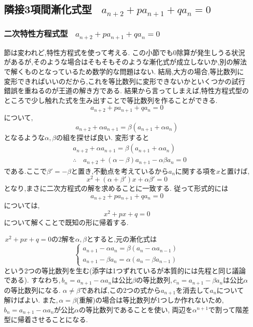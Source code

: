 
\subsection{隣接3項間漸化式型 \, $\displaystyle a_{n+2}+pa_{n+1}+qa_n=0$}
  \subsubsection{二次特性方程式型 \, $\displaystyle a_{n+2}+pa_{n+1}+qa_n=0$}
    節は変われど,特性方程式を使って考える.
    この小節でも0除算が発生しうる状況があるが,そのような場合はそもそもそのような漸化式が成立しないか,別の解法で解くものとなっているため数学的な問題はない.
    結局,大方の場合,等比数列に変形できればいいのだから,これを等比数列に変形できないかといくつかの試行錯誤を重ねるのが王道の解き方である.
    結果から言ってしまえば,特性方程式型のところで少し触れた式を生み出すことで等比数列を作ることができる.
    \[
      a_{n+2}+pa_{n+1}+qa_n=0
    \]
    について,
    \[
      a_{n+2}+\alpha a_{n+1}=\beta(a_{n+1}+\alpha a_{n})
    \]
    となるような$\alpha,\beta$の組を探せば良い.
    変形すると
    \begin{align*}
      &a_{n+2}+\alpha a_{n+1}=\beta(a_{n+1}+\alpha a_{n})\\
      &\therefore \quad a_{n+2}+(\alpha-\beta)a_{n+1}-\alpha\beta a_n=0
    \end{align*}
    である.ここで$\beta'=-\beta$と置き,不動点を考えているから$a_n$に関する項を$x$と置けば,
    \[
      x^2+(\alpha+\beta')x+\alpha\beta'=0      
    \]
    となり,まさに二次方程式の解を求めることに一致する.
    従って形式的には
    \[
      a_{n+2}+pa_{n+1}+qa_n=0
    \]
    については,
    \[
      x^2+px+q=0
    \]
    について解くことで既知の形に帰着する.

    \,$x^2+px+q=0$の2解を$\alpha,\beta$とすると,元の漸化式は
    \[
      \begin{cases}
        a_{n+1}-\alpha a_n=\beta(a_n-\alpha a_{n-1})\\
        a_{n+1}-\beta a_n=\alpha(a_n-\beta a_{n-1})
      \end{cases}
    \]
    という2つの等比数列を生む(添字は1つずれているが本質的には先程と同じ議論である).
    すなわち,\,$b_n=a_{n+1}-\alpha a_n$は公比$\beta$の等比数列,\,$c_n=a_{n+1}-\beta a_n$は公比$\alpha$の等比数列になる.
    $\alpha\ne\beta$であれば,この2つの式から$a_{n+1}$を消去して$a_n$について解けばよい.
    また,\,$\alpha=\beta$(重解)の場合は等比数列が1つしか作れないため,\,$b_n=a_{n+1}-\alpha a_n$が公比$\alpha$の等比数列であることを使い,
    両辺を$\alpha^{n+1}$で割って階差型に帰着させることになる.

